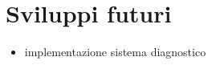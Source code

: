 \clearpage{\pagestyle{empty}\cleardoublepage}
\chapter{Sviluppi futuri}
\begin{itemize}
\item implementazione sistema diagnostico
\end{itemize}
